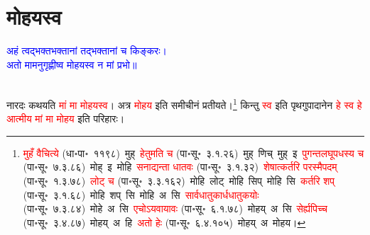 \section[मोहयस्व]{मोहयस्व}
\centering\textcolor{blue}{अहं त्वद्भक्तभक्तानां तद्भक्तानां च किङ्करः।\nopagebreak\\
अतो मामनुगृह्णीष्व मोहयस्व न मां प्रभो॥}\nopagebreak\\
\\
\fontsize{14}{21}\selectfont\begin{sloppypar}\justifying\noindent\hspace{10mm} नारदः कथयति \textcolor{red}{मां मा मोहयस्व}। अत्र \textcolor{red}{मोहय} इति समीचीनं प्रतीयते।\footnote{\textcolor{red}{मुहँ वैचित्ये} (धा॰पा॰~११९८)~\arrow मुह्~\arrow \textcolor{red}{हेतुमति च} (पा॰सू॰~३.१.२६)~\arrow मुह्~णिच्~\arrow मुह्~इ~\arrow \textcolor{red}{पुगन्त\-लघूपधस्य च} (पा॰सू॰~७.३.८६)~\arrow मोह्~इ~\arrow मोहि~\arrow \textcolor{red}{सनाद्यन्ता धातवः} (पा॰सू॰~३.१.३२)~\arrow \textcolor{red}{शेषात्कर्तरि परस्मैपदम्} (पा॰सू॰~१.३.७८)~\arrow \textcolor{red}{लोट् च} (पा॰सू॰~३.३.१६२)~\arrow मोहि~लोट्~\arrow मोहि~सिप्~\arrow मोहि~सि~\arrow \textcolor{red}{कर्तरि शप्} (पा॰सू॰~३.१.६८)~\arrow मोहि~शप्~सि~\arrow मोहि~अ~सि~\arrow \textcolor{red}{सार्वधातुकार्धधातुकयोः} (पा॰सू॰~७.३.८४)~\arrow मोहे~अ~सि~\arrow \textcolor{red}{एचोऽयवायावः} (पा॰सू॰~६.१.७८)~\arrow मोहय्~अ~सि~\arrow \textcolor{red}{सेर्ह्यपिच्च} (पा॰सू॰~३.४.८७)~\arrow मोहय्~अ~हि~\arrow \textcolor{red}{अतो हेः} (पा॰सू॰~६.४.१०५)~\arrow मोहय्~अ~\arrow मोहय।} किन्तु \textcolor{red}{स्व} इति पृथगुपादानेन \textcolor{red}{हे स्व हे आत्मीय मां मा मोहय} इति परिहारः।\end{sloppypar}
